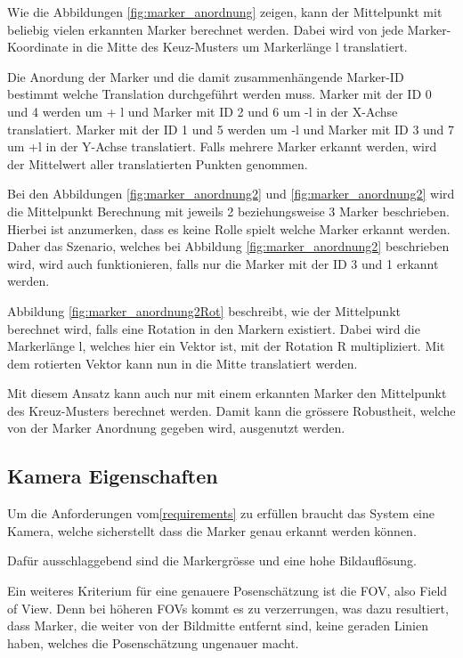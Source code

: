 Wie die Abbildungen \ref{fig:marker_anordnung} zeigen, kann der Mittelpunkt mit beliebig vielen erkannten Marker berechnet werden.
Dabei wird von jede Marker-Koordinate in die Mitte des Keuz-Musters um Markerlänge l translatiert.

Die Anordung der Marker und die damit zusammenhängende Marker-ID bestimmt welche Translation durchgeführt werden muss. 
Marker mit der ID 0 und 4 werden um + l und Marker mit ID 2 und 6 um -l in der X-Achse translatiert. 
Marker mit der ID 1 und 5 werden um -l und Marker mit ID 3 und 7 um +l in der Y-Achse translatiert. 
Falls mehrere Marker erkannt werden, wird der Mittelwert aller translatierten Punkten genommen.

Bei den Abbildungen \ref{fig:marker_anordnung2} und \ref{fig:marker_anordnung2} wird die Mittelpunkt Berechnung mit jeweils 2 beziehungsweise 3 Marker beschrieben.
Hierbei ist anzumerken, dass es keine Rolle spielt welche Marker erkannt werden. 
Daher das Szenario, welches bei Abbildung \ref{fig:marker_anordnung2} beschrieben wird, wird auch funktionieren, falls nur die Marker mit der ID 3 und 1 erkannt werden.

Abbildung \ref{fig:marker_anordnung2Rot} beschreibt, wie der Mittelpunkt berechnet wird, falls eine Rotation in den Markern existiert.
Dabei wird die Markerlänge l, welches hier ein Vektor ist, mit der Rotation R multipliziert. 
Mit dem rotierten Vektor kann nun in die Mitte translatiert werden.  

Mit diesem Ansatz kann auch nur mit einem erkannten Marker den Mittelpunkt des Kreuz-Musters berechnet werden. 
Damit kann die grössere Robustheit, welche von der Marker Anordnung gegeben wird, ausgenutzt werden.


\subsection{Kamera Eigenschaften}

Um die Anforderungen vom\ref{requirements} zu erfüllen braucht das System eine Kamera, welche sicherstellt dass die Marker genau erkannt werden können.

Dafür ausschlaggebend sind die Markergrösse und eine hohe Bildauflösung\cite{noauthor_designing_2020}. 

Ein weiteres Kriterium für eine genauere Posenschätzung ist die FOV, also Field of View. 
Denn bei höheren FOVs kommt es zu verzerrungen, was dazu resultiert, dass Marker, die weiter von der Bildmitte entfernt sind, keine geraden Linien haben, welches die Posenschätzung ungenauer macht.


